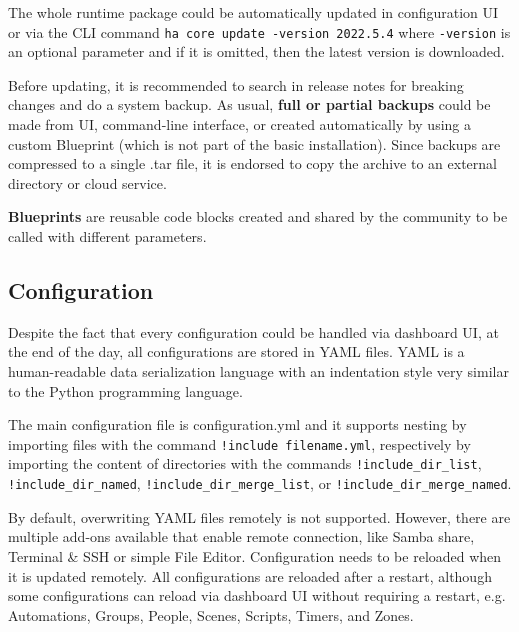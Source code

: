 \documentclass[fleqn,10pt]{olplainarticle}
\begin{document}
\vskip10pt

The whole runtime package could be automatically updated in configuration UI or via the CLI command \texttt{ha core update -version 2022.5.4} where \texttt{-version} is an optional parameter and if it is omitted, then the latest version is downloaded.

\vskip10pt

Before updating, it is recommended to search in release notes for breaking changes and do a system backup. As usual, \textbf{full or partial backups} could be made from UI, command-line interface, or created automatically by using a custom Blueprint (which is not part of the basic installation). Since backups are compressed to a single .tar file, it is endorsed to copy the archive to an external directory or cloud service.

\vskip10pt

\textbf{Blueprints} are reusable code blocks created and shared by the community to be called with different parameters.


\subsection{Configuration}

Despite the fact that every configuration could be handled via dashboard UI, at the end of the day, all configurations are stored in YAML files. YAML is a human-readable data serialization language \cite{YamlSpecification122} with an indentation style very similar to the Python programming language.

\vskip10pt

The main configuration file is configuration.yml and it supports nesting by importing files with the command \texttt{!include filename.yml}, respectively by importing the content of directories with the commands \texttt{!include_dir_list}, \texttt{!include_dir_named}, \texttt{!include_dir_merge_list}, or \texttt{!include_dir_merge_named}.

\vskip10pt

By default, overwriting YAML files remotely is not supported. However, there are multiple add-ons available that enable remote connection, like Samba share, Terminal \& SSH or simple File Editor. Configuration needs to be reloaded when it is updated remotely. All configurations are reloaded after a restart, although some configurations can reload via dashboard UI without requiring a restart, e.g. Automations, Groups, People, Scenes, Scripts, Timers, and Zones.
\end{document}
